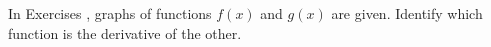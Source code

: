 {\noindent In Exercises}
{, graphs of functions $f(x)$ and $g(x)$ are given. Identify which function is the derivative of the other.}
